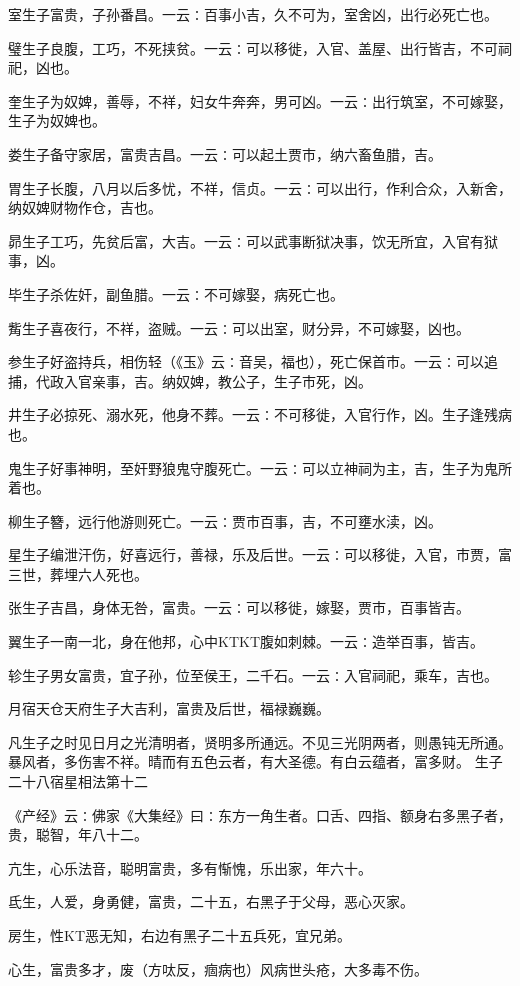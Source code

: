 \documentclass[a4paper,12pt,UTF8,twoside]{ctexbook}
\begin{document}
室生子富贵，子孙番昌。一云∶百事小吉，久不可为，室舍凶，出行必死亡也。

璧生子良腹，工巧，不死挟贫。一云∶可以移徙，入官、盖屋、出行皆吉，不可祠祀，凶也。

奎生子为奴婢，善辱，不祥，妇女牛奔奔，男可凶。一云∶出行筑室，不可嫁娶，生子为奴婢也。

娄生子备守家居，富贵吉昌。一云∶可以起土贾市，纳六畜鱼腊，吉。

胃生子长腹，八月以后多忧，不祥，信贞。一云∶可以出行，作利合众，入新舍，纳奴婢财物作仓，吉也。

昴生子工巧，先贫后富，大吉。一云∶可以武事断狱决事，饮无所宜，入官有狱事，凶。

毕生子杀佐奸，副鱼腊。一云∶不可嫁娶，病死亡也。

觜生子喜夜行，不祥，盗贼。一云∶可以出室，财分异，不可嫁娶，凶也。

参生子好盗持兵，相伤轻（《玉》云∶音吴，福也），死亡保首市。一云∶可以追捕，代政入官亲事，吉。纳奴婢，教公子，生子市死，凶。

井生子必掠死、溺水死，他身不葬。一云∶不可移徙，入官行作，凶。生子逢残病也。

鬼生子好事神明，至奸野狼鬼守腹死亡。一云∶可以立神祠为主，吉，生子为鬼所着也。

柳生子簪，远行他游则死亡。一云∶贾市百事，吉，不可壅水渎，凶。

星生子编泄汗伤，好喜远行，善禄，乐及后世。一云∶可以移徙，入官，市贾，富三世，葬埋六人死也。

张生子吉昌，身体无咎，富贵。一云∶可以移徙，嫁娶，贾市，百事皆吉。

翼生子一南一北，身在他邦，心中KTKT腹如刺棘。一云∶造举百事，皆吉。

轸生子男女富贵，宜子孙，位至侯王，二千石。一云∶入官祠祀，乘车，吉也。

月宿天仓天府生子大吉利，富贵及后世，福禄巍巍。

凡生子之时见日月之光清明者，贤明多所通远。不见三光阴两者，则愚钝无所通。暴风者，多伤害不祥。晴而有五色云者，有大圣德。有白云蕴者，富多财。
生子二十八宿星相法第十二

《产经》云∶佛家《大集经》曰∶东方一角生者。口舌、四指、额身右多黑子者，贵，聪智，年八十二。

亢生，心乐法音，聪明富贵，多有惭愧，乐出家，年六十。

氐生，人爱，身勇健，富贵，二十五，右黑子于父母，恶心灭家。

房生，性KT恶无知，右边有黑子二十五兵死，宜兄弟。

心生，富贵多才，废（方呔反，痼病也）风病世头疮，大多毒不伤。
\end{document}
